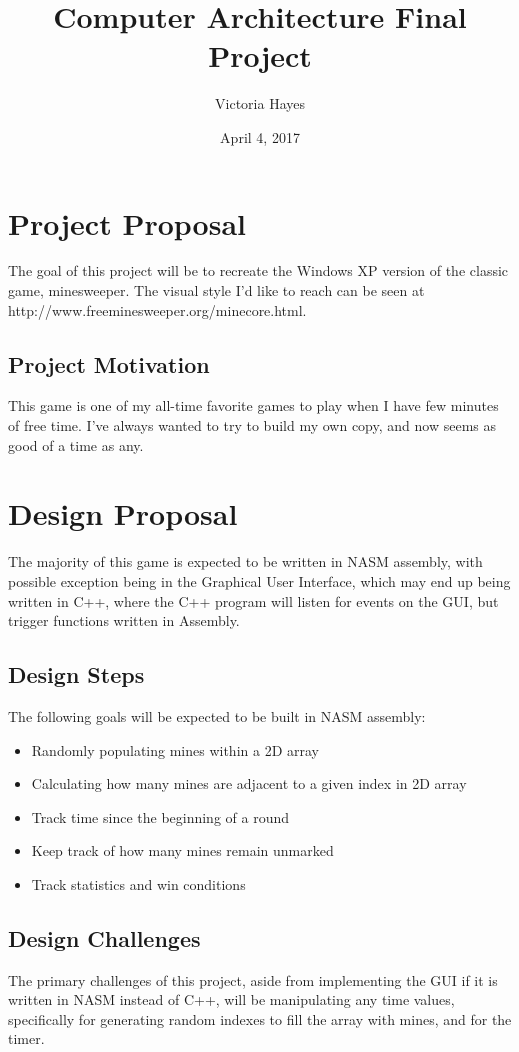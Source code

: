 \documentclass{article}
\title{Computer Architecture Final Project}
\date{April 4, 2017}
\author{Victoria Hayes}
\begin{document}
	\maketitle
    \section{Project Proposal}
    The goal of this project will be to recreate the Windows XP version of the classic game, minesweeper. The visual style I'd like to reach can be seen at http://www.freeminesweeper.org/minecore.html. 
    \subsection{Project Motivation}
    This game is one of my all-time favorite games to play when I have few minutes of free time. I've always wanted to try to build my own copy, and now seems as good of a time as any.
    \section{Design Proposal}
    The majority of this game is expected to be written in NASM assembly, with possible exception being in the Graphical User Interface, which may end up being written in C++, where the C++ program will listen for events on the GUI, but trigger functions written in Assembly.
    \subsection{Design Steps}
    The following goals will be expected to be built in NASM assembly:
    \begin{itemize}
    \item Randomly populating mines within a 2D array
    \item Calculating how many mines are adjacent to a given index in 2D array
    \item Track time since the beginning of a round
    \item Keep track of how many mines remain unmarked
    \item Track statistics and win conditions
    \end{itemize}
    \subsection{Design Challenges}
    The primary challenges of this project, aside from implementing the GUI if it is written in NASM instead of C++, will be manipulating any time values, specifically for generating random indexes to fill the array with mines, and for the timer.
    
\end{document}
